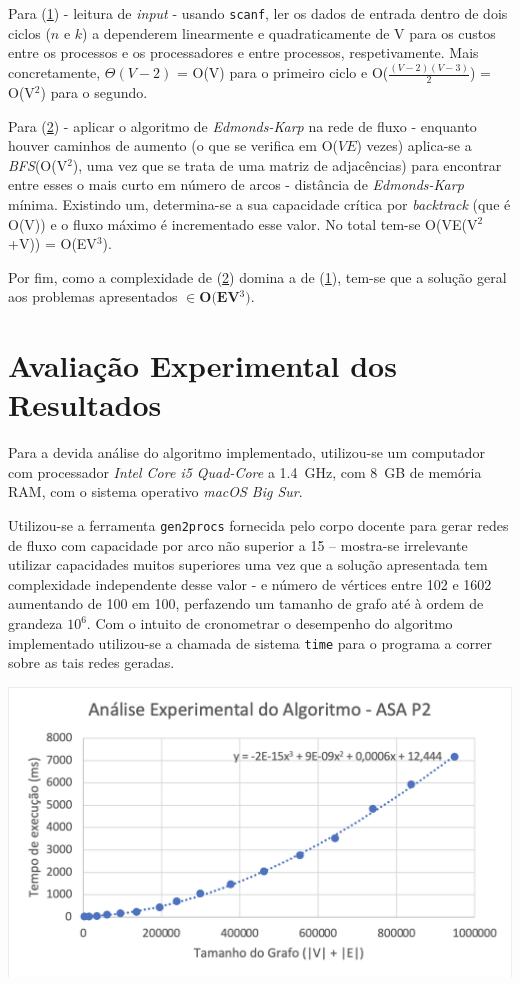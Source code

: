 \documentclass[12pt]{article}
\begin{document}
Para (\underline{1}) - leitura de \emph{input} - usando \texttt{scanf}, ler os dados de entrada dentro de dois ciclos ($n$ e $k$) a dependerem linearmente e quadraticamente de V para os custos entre os processos e os processadores e entre processos, respetivamente. Mais concretamente, $\Theta{(V - 2)}$ = O(V) para o primeiro ciclo e O($\frac{(V-2)(V-3)}{2}$) = O(V$^2$) para o segundo.

Para (\underline{2}) - aplicar o algoritmo de \emph{Edmonds-Karp} na rede de fluxo - enquanto houver caminhos de aumento (o que se verifica em O($VE$) vezes) aplica-se a \emph{BFS}(O(V$^2$), uma vez que se trata de uma matriz de adjacências) para encontrar entre esses o mais curto em número de arcos - distância de \emph{Edmonds-Karp} mínima. Existindo um, determina-se a sua capacidade crítica por \emph{backtrack} (que é O(V)) e o fluxo máximo é incrementado esse valor. No total tem-se O(VE(V$^2$+V)) = O(EV$^3$).

Por fim, como a complexidade de (\underline{2}) domina a de (\underline{1}), tem-se que a solução geral aos problemas apresentados $\in{\textbf{O(EV$^3$)}}$.

\section{Avaliação Experimental dos Resultados}
Para a devida análise do algoritmo implementado, utilizou-se um computador com processador \emph{Intel Core i5 Quad-Core} a \SI{1,4}{GHz}, com \SI{8}{GB} de memória RAM, com o sistema operativo \emph{macOS Big Sur}.

Utilizou-se a ferramenta \texttt{gen2procs} fornecida pelo corpo docente para gerar redes de fluxo com capacidade por arco não superior a 15 – mostra-se irrelevante utilizar capacidades muitos superiores uma vez que a solução apresentada tem complexidade independente desse valor - e número de vértices entre 102 e 1602 aumentando de 100 em 100, perfazendo um tamanho de grafo até à ordem de grandeza $10^6$. Com o intuito de cronometrar o desempenho do algoritmo implementado utilizou-se a chamada de sistema \texttt{time} para o programa a correr sobre as tais redes geradas.

\begin{center}
\includegraphics[width=\linewidth]{reglinear.png}
\end{center}
\end{document}
